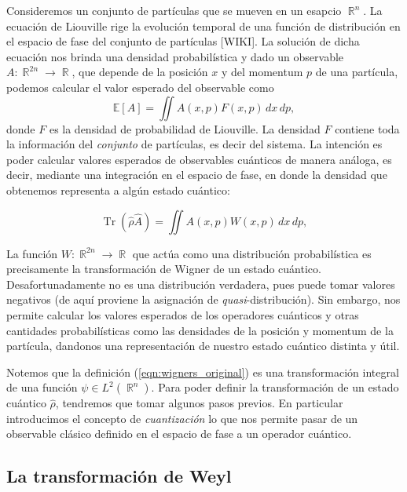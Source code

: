 \documentclass[a4paper]{report}
\DeclareMathOperator{\R}{\mathbb{R}}
\DeclareMathOperator{\Tr}{Tr}
\begin{document}
  Consideremos un conjunto de partículas que se mueven en un
  esapcio $\R^{n}$. La ecuación de Liouville rige la
  evolución temporal de una función de distribución en el
  espacio de fase del conjunto de partículas [WIKI]. La
  solución de dicha ecuación nos brinda una densidad
  probabilística y dado un observable $A : \R^{2n} \to \R$,
  que depende de la posición $x$ y del momentum $p$ de una
  partícula, podemos calcular el valor esperado del
  observable como
  \begin{equation}
    \mathbb E[A]
    = \iint A(x,p) F(x,p) \, dx \, dp,
  \end{equation}
  donde $F$ es la densidad de probabilidad de Liouville. La
  densidad $F$ contiene toda la información del
  \textit{conjunto} de partículas, es decir del sistema. La
  intención es poder calcular valores esperados de
  observables cuánticos de manera análoga, es decir,
  mediante una integración en el espacio de fase, en donde
  la densidad que obtenemos representa a algún estado
  cuántico:

  \begin{equation}
    \Tr\left(\hat{\rho} \hat{A}\right)
    = \iint A(x,p)W(x,p) \, dx \, dp,
  \end{equation}

  La función $W : \R^{2n} \to \R$ que actúa como una
  distribución probabilística es precisamente la
  transformación de Wigner de un estado cuántico.
  Desafortunadamente no es una distribución verdadera, pues
  puede tomar valores negativos (de aquí proviene la
  asignación de \textit{quasi}-distribución). Sin embargo,
  nos permite calcular los valores esperados de los
  operadores cuánticos y otras cantidades probabilísticas
  como las densidades de la posición y momentum de la
  partícula, dandonos una representación de nuestro estado
  cuántico distinta y útil.

  Notemos que la definición (\ref{eqn:wigners_original}) es
  una transformación integral de una función $\psi \in
  L^2(\R^{n})$. Para poder definir la transformación de un
  estado cuántico $\hat{\rho}$, tendremos que tomar algunos
  pasos previos. En particular introducimos el concepto de
  \textit{cuantización} lo que nos permite pasar de un
  observable clásico definido en el espacio de fase a un
  operador cuántico.

  \subsection{La transformación de Weyl}
\end{document}
